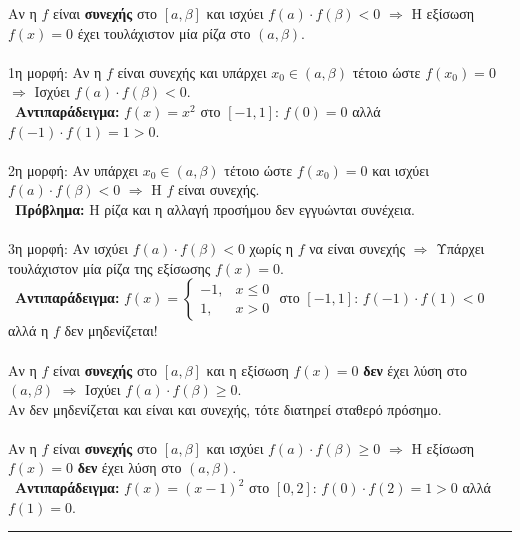\theor{\true}
Αν η $f$ είναι \textbf{συνεχής} στο $[a,\beta]$ και ισχύει $f(a)\cdot f(\beta)<0$ $\Rightarrow$ Η εξίσωση $f(x)=0$ έχει τουλάχιστον μία ρίζα στο $(a,\beta)$.\\\\
\antistr{\false}
{\kerkissans 1η μορφή:} Αν η $f$ είναι συνεχής και υπάρχει $x_0\in(a,\beta)$ τέτοιο ώστε $f(x_0)=0$ $\Rightarrow$ Ισχύει $f(a)\cdot f(\beta)<0$.\\
\textcolor{error}{\faTimes\ \textbf{Αντιπαράδειγμα:}} $f(x)=x^2$ στο $[-1,1]$: $f(0)=0$ αλλά $f(-1)\cdot f(1)=1>0$.\\\\
{\kerkissans 2η μορφή:} Αν υπάρχει $x_0\in(a,\beta)$ τέτοιο ώστε $f(x_0)=0$ και ισχύει $f(a)\cdot f(\beta)<0$ $\Rightarrow$ Η $f$ είναι συνεχής.\\
\textcolor{error}{\faTimes\ \textbf{Πρόβλημα:}} Η ρίζα και η αλλαγή προσήμου δεν εγγυώνται συνέχεια.\\\\
{\kerkissans 3η μορφή:} Αν ισχύει $f(a)\cdot f(\beta)<0$ χωρίς η $f$ να είναι συνεχής $\Rightarrow$ Υπάρχει τουλάχιστον μία ρίζα της εξίσωσης $f(x)=0$.\\
\textcolor{error}{\faTimes\ \textbf{Αντιπαράδειγμα:}} $f(x)=\begin{cases} -1, & x\le 0 \\ 1, & x>0 \end{cases}$ στο $[-1,1]$: $f(-1)\cdot f(1)<0$ αλλά η $f$ δεν μηδενίζεται!\\\\
\aath{\true}
Αν η $f$ είναι \textbf{συνεχής} στο $[a,\beta]$ και η εξίσωση $f(x)=0$ \textbf{δεν} έχει λύση στο $(a,\beta)$
$\Rightarrow$ Ισχύει $f(a)\cdot f(\beta)\ge 0$.\\
{\small Αν δεν μηδενίζεται και είναι και συνεχής, τότε διατηρεί σταθερό πρόσημο.}\\\\
\aaa{\false}
Αν η $f$ είναι \textbf{συνεχής} στο $[a,\beta]$ και ισχύει $f(a)\cdot f(\beta)\ge 0$ $\Rightarrow$ Η εξίσωση $f(x)=0$ \textbf{δεν} έχει λύση στο $(a,\beta)$.\\
\textcolor{error}{\faTimes\ \textbf{Αντιπαράδειγμα:}} $f(x)=(x-1)^2$ στο $[0,2]$: $f(0)\cdot f(2)=1>0$ αλλά $f(1)=0$.

\bigskip\noindent\rule{\textwidth}{0.4pt}\bigskip


